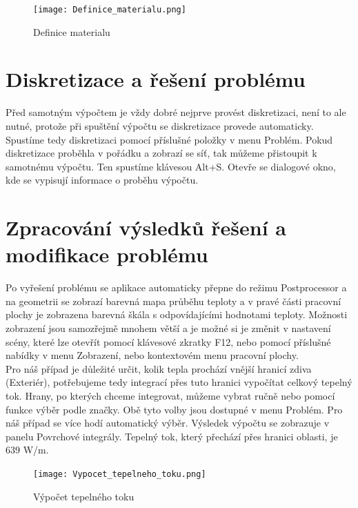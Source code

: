 \documentclass[a4paper, oneside]{article}
\begin{document}
\begin{figure}[htbp]
\centering
\texttt{[image: Definice\_materialu.png]}\\
\caption{Definice materialu}
\end{figure}
\newpage
\section{Diskretizace a řešení problému}

	Před samotným výpočtem je vždy dobré nejprve provést diskretizaci, není to ale nutné, protože při spuštění výpočtu se diskretizace provede automaticky. Spustíme tedy diskretizaci pomocí příslušné položky v menu Problém. Pokud diskretizace proběhla v pořádku a zobrazí se síť, tak můžeme přistoupit k samotnému výpočtu. Ten spustíme klávesou Alt+S. Otevře se dialogové okno, kde se vypisují informace o proběhu výpočtu.\\
	
\section{Zpracování výsledků řešení a modifikace problému}
	Po vyřešení problému se aplikace automaticky přepne do režimu Postprocessor a na geometrii se zobrazí barevná mapa průběhu teploty a v pravé části pracovní plochy je zobrazena barevná škála s odpovídajícími hodnotami teploty. Možnosti zobrazení jsou samozřejmě mnohem větší a je možné si je změnit v nastavení scény, které lze otevřít pomocí klávesové zkratky F12, nebo pomocí příslušné nabídky v menu Zobrazení, nebo kontextovém menu pracovní plochy.\\
	Pro náš případ je důležité určit, kolik tepla prochází vnější hranicí zdiva (Exteriér), potřebujeme tedy integrací přes tuto hranici vypočítat celkový tepelný tok. Hrany, po kterých chceme integrovat, můžeme vybrat ručně nebo pomocí funkce výběr podle značky. Obě tyto volby jsou dostupné v menu Problém. Pro náš případ se více hodí automatický výběr. Výsledek výpočtu se zobrazuje v panelu Povrchové integrály. Tepelný tok, který přechází přes hranici oblasti, je 639 W/m.\\
	
\begin{figure}[htbp]
\centering
\texttt{[image: Vypocet\_tepelneho\_toku.png]}\\
\caption{Výpočet tepelného toku}
\end{figure}
\end{document}
